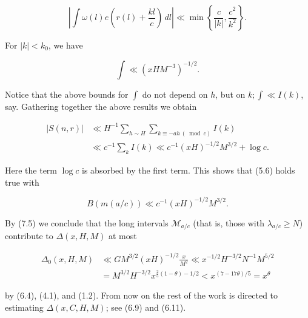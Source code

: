 \documentclass[10pt]{article}
\begin{document}
\begin{equation*}
\left|\int \omega(l)e\left(r(l)+\frac{kl}{c}\right)\,dl\right|\ll\min\left\{\frac{c}{|k|},\frac{c^{2}}{k^{2}}\right\} . \tag{7.3}
\end{equation*}


For $|k|<k_{0}$, we have


\begin{equation*}
\int \ll\left(x H M^{-3}\right)^{-1 / 2} . \tag{7.4}
\end{equation*}


Notice that the above bounds for $\int$ do not depend on $h$, but on $k ; \int \ll I(k)$, say. Gathering together the above results we obtain

$$
\begin{aligned}
|S(n,r)| & \ll H^{-1} \sum_{h \sim H} \sum_{k \equiv-a h\, (\bmod c)} I(k) \\
& \ll c^{-1} \sum_{k} I(k) \ll c^{-1}(x H)^{-1 / 2} M^{3 / 2}+\log c .
\end{aligned}
$$

Here the term $\log c$ is absorbed by the first term. This shows that (5.6) holds true with


\begin{equation*}
B(m(a / c)) \ll c^{-1}(x H)^{-1 / 2} M^{3 / 2} . \tag{7.5}
\end{equation*}


By (7.5) we conclude that the long intervals $\mathscr{M}_{a / c}$ (that is, those with $\lambda_{a / c} \geqslant N$) contribute to $\Delta(x, H, M)$ at most


\begin{align*}
\Delta_{0}(x,H,M) & \ll G M^{3 / 2}(x H)^{-1 / 2} \frac{x}{M^{2}} \ll x^{-1 / 2} H^{-3 / 2} N^{-1} M^{5 / 2} \\
& =M^{3 / 2} H^{-3 / 2} x^{\frac{2}{5}(1-\theta)-1 / 2}<x^{(7-17 \theta) / 5}=x^{\theta} \tag{7.6}
\end{align*}


by (6.4), (4.1), and (1.2).
From now on the rest of the work is directed to estimating $\Delta(x, C, H, M)$; see (6.9) and (6.11).
\end{document}
